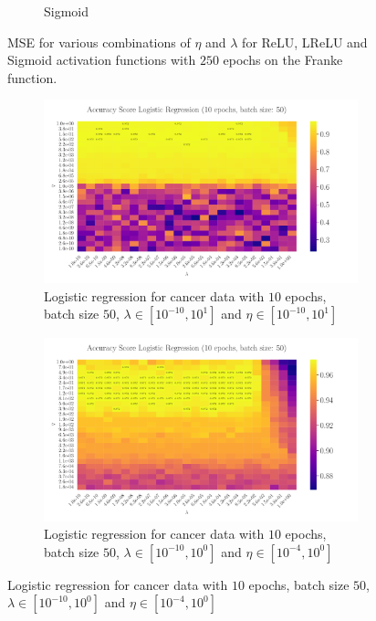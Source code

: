 \documentclass[%
reprint,s
amsmath,amssymb,
aps,
]{revtex4-2}
\begin{document}
\begin{figure}[ht!]
\begin{subfigure}{0.4353\textwidth}
		\caption{Sigmoid}
	\end{subfigure}
	\caption{MSE for various combinations of $\eta$ and $\lambda$ for ReLU, LReLU and Sigmoid activation functions with $250$ epochs on the Franke function.}
	\label{fig:FFNN_Franke_heatmaps}	
\end{figure}

\begin{figure}
	\begin{subfigure}{0.4353\textwidth}
		\includegraphics[width=\textwidth]{Python/Figures/LogReg25x25_epoch10_batchS50.pdf}
		\caption{Logistic regression for cancer data with \(10\) epochs, batch size \(50\), \(\lambda\in[10^{-10}, 10^{1}]\) and \(\eta\in[10^{-10}, 10^{1}]\)}
		\label{fig:LogReg25x25_epoch10_bacthS50}
	\end{subfigure}
	\hfill
	\begin{subfigure}{0.4353\textwidth}
		\includegraphics[width=\textwidth]{Python/Figures/LogReg25x25_epoch10_batchS50_zoomed.pdf}
		\caption{Logistic regression for cancer data with \(10\) epochs, batch size \(50\), \(\lambda\in[10^{-10}, 10^{0}]\) and \(\eta\in[10^{-4}, 10^{0}]\)}

\end{subfigure}
\end{figure}
\end{document}
